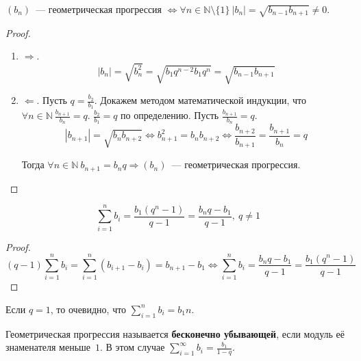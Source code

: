 \begin{theorem}
$(b_n)$~--- геометрическая прогрессия $\Leftrightarrow \forall n \in \mathbb N \setminus \{ 1 \} \ |b_n| = \sqrt{b_{n-1} b_{n+1}} \neq 0$.
\end{theorem}
\begin{proof}
\begin{enumerate}
	\item $\Rightarrow$.
	\begin{equation*}
	|b_n| = \sqrt{b_n^2} =
	\sqrt{b_1 q^{n-2} b_1 q^n} =
	\sqrt{b_{n-1} b_{n+1}}
	\end{equation*}
	
	\item $\Leftarrow$. Пусть $q = \frac{b_2}{b_1}$.
	Докажем методом математической индукции, что $\forall n \in \mathbb N \ \frac{b_{n+1}}{b_n} = q$.
		\indbase $\frac{b_2}{b_1} = q$ по определению.
		\indstep Пусть $\frac{b_{n+1}}{b_n} = q$.
		\begin{equation*}
		|b_{n+1}| = \sqrt{b_n b_{n+2}} \Leftrightarrow
		b_{n+1}^2 = b_n b_{n+2} \Leftrightarrow
		\frac{b_{n+2}}{b_{n+1}} = \frac{b_{n+1}}{b_n} = q
		\end{equation*}
		\indend
		
	Тогда $\forall n \in \mathbb N \ b_{n+1} = b_n q \Rightarrow (b_n)$~--- геометрическая прогрессия.
\end{enumerate}
\end{proof}

\begin{theorem}
\begin{equation*}
\sum_{i=1}^n b_i = \frac{b_1(q^n - 1)}{q - 1} = \frac{b_n q - b_1}{q - 1}, \ q \neq 1
\end{equation*}
\end{theorem}
\begin{proof}
\begin{equation*}
(q - 1) \sum_{i=1}^n b_i =
\sum_{i=1}^n (b_{i+1} - b_i) =
b_{n+1} - b_1 \Leftrightarrow
\sum_{i=1}^n b_i = \frac{b_n q - b_1}{q - 1} = \frac{b_1(q^n - 1)}{q - 1}
\end{equation*}
\end{proof}

Если $q = 1$, то очевидно, что $\displaystyle \sum_{i=1}^n b_i = b_1 n$.

Геометрическая прогрессия называется \textbf{бесконечно убывающей}, если модуль её знаменателя меньше~$1$.
В этом случае $\displaystyle \sum_{i=1}^\infty b_i = \frac{b_1}{1 - q}$.